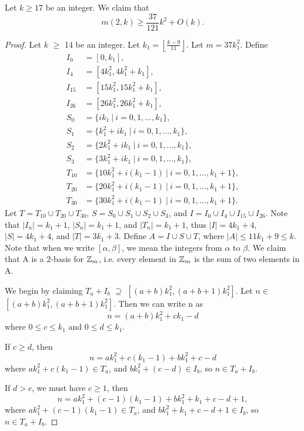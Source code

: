 \begin{theorem}
Let $k \geq 17$ be an integer. We claim that
 \[
m(2,k) \geq \frac{37}{121}k^2 + O(k). 
\]
\end{theorem}
\begin{proof}
Let $k$ $\geq$ 14 be an integer. Let $k_1 = \left \lfloor \frac{k - 9}{11} \right \rfloor$. Let $m = 37k_1^2$.  Define 
\begin{align*}
I_0 &= [0, k_1], \\
I_4 &= [4k_1^2, 4k_1^2+k_1], \\
I_{15} &= [15k_1^2, 15k_1^2+k_1],\\
I_{26} &= [26k_1^2, 26k_1^2+k_1], \\
S_0 &= \{ik_1 \ |\  i = 0 , 1, ... , k_1\},\\
S_1 &= \{k_1^2 + ik_1 \ |\  i = 0 , 1, ... , k_1\},\\
S_2 &= \{2k_1^2 + ik_1 \ |\  i = 0 , 1, ... , k_1\}, \\
S_3 &= \{3k_1^2 +ik_1 \ |\   i = 0 , 1, ... , k_1\}, \\
T_{10} &= \{10k_1^2+ i(k_1 - 1) \ |\   i = 0 , 1, ... , k_1 + 1\},\\
T_{20} &= \{20k_1^2 + i(k_1 - 1) \ |\  i = 0 , 1, ... , k_1 + 1\}, \\
T_{30} &= \{30k_1^2 + i(k_1 - 1) \ |\  i = 0 , 1, ... , k_1 + 1\}.
\end{align*}
Let $T = T_{10} \cup T_{20} \cup T_{30}$, $S = S_{0} \cup S_{1} \cup S_{2} \cup S_{3}$, and $I = I_{0} \cup I_{4} \cup I_{15} \cup I_{26}.$ Note that $|I_n| = k_1 + 1$, $|S_n| = k_1 + 1$, and $|T_n| = k_1 + 1$, thus $|I| = 4k_1 + 4$, $|S| = 4k_1 + 4$, and $|T| = 3k_1 + 3$. Define $A = I \cup S \cup T$, where $|A| \leq 11k_1 + 9 \leq k$. Note that when we write $[\alpha, \beta]$, we mean the integers from $\alpha$ to $\beta$. We claim that A is a 2-basis for $\mbox{$\mathbb Z$}_m$, i.e. every element in $\mbox{$\mathbb Z$}_m$ is the sum of two elements in A.

We begin by claiming $T_a + I_b$ $\supseteq$ $[(a + b)k_1^2 ,  (a + b + 1)k_1^2]$. Let $n \in$ $[(a + b)k_1^2 ,  (a + b + 1)k_1^2]$.
Then we can write n as 
\[
n = (a + b) k_1^2 + ck_1 - d
\]
where $0 \leq c \leq k_1$ and $0 \leq d \leq k_1$.

If $c \geq d$, then
\[
n = ak_1^2 + c(k_1- 1) + bk_1^2 +  c - d
\]
where $ak_1^2 +c(k_1- 1) \in T_a$, and $bk_1^2 + (c - d) \in I_b$, so $n \in T_a + I_b$. 

If $d>c$, we must have $c \geq 1$, then
\[
n = ak_1^2 + (c - 1)(k_1 - 1) + bk_1^2 + k_1 +c - d + 1, 
\]
where $ak_1^2 + (c - 1)(k_1 - 1) \in T_a$, and $bk_1^2 + k_1 + c - d + 1 \in I_b$, so $n \in T_a + I_b$. 


\end{proof}

